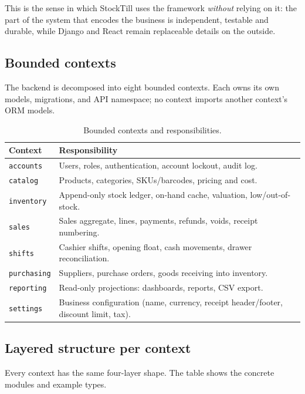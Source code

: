 \documentclass[11pt,a4paper]{article}
\begin{document}
\noindent
This is the sense in which StockTill uses the framework \emph{without} relying on it: the part of the
system that encodes the business is independent, testable and durable, while Django and React remain
replaceable details on the outside.

\subsection{Bounded contexts}

The backend is decomposed into eight bounded contexts. Each owns its own models, migrations, and API
namespace; no context imports another context's ORM models.

\begin{table}[htbp]\centering
\small
\caption{Bounded contexts and responsibilities.}
\begin{tabular}{@{}p{}p{}@{}}
\toprule
\textbf{Context} & \textbf{Responsibility} \\
\midrule
\texttt{accounts} & Users, roles, authentication, account lockout, audit log. \\
\texttt{catalog} & Products, categories, SKUs/barcodes, pricing and cost. \\
\texttt{inventory} & Append-only stock ledger, on-hand cache, valuation, low/out-of-stock. \\
\texttt{sales} & Sales aggregate, lines, payments, refunds, voids, receipt numbering. \\
\texttt{shifts} & Cashier shifts, opening float, cash movements, drawer reconciliation. \\
\texttt{purchasing} & Suppliers, purchase orders, goods receiving into inventory. \\
\texttt{reporting} & Read-only projections: dashboards, reports, CSV export. \\
\texttt{settings} & Business configuration (name, currency, receipt header/footer, discount limit, tax). \\
\bottomrule
\end{tabular}
\end{table}

\subsection{Layered structure per context}

Every context has the same four-layer shape. The table shows the concrete modules and example
types.
\end{document}
